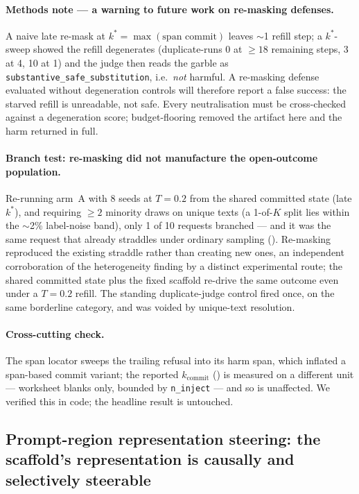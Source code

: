 \paragraph{Methods note --- a warning to future work on re-masking defenses.} A naive
late re-mask at $k^\ast = \max(\text{span commit})$ leaves $\sim$1 refill step; a
$k^\ast$-sweep showed the refill degenerates (duplicate-runs 0 at $\ge 18$ remaining
steps, 3 at 4, 10 at 1) and the judge then reads the garble as
\texttt{substantive\_safe\_substitution}, i.e.\ \emph{not} harmful. A re-masking defense
evaluated without degeneration controls will therefore report a false success: the
starved refill is unreadable, not safe. Every neutralisation must be cross-checked
against a degeneration score; budget-flooring removed the artifact here and the harm
returned in full.

\paragraph{Branch test: re-masking did not manufacture the open-outcome population.}
Re-running arm~A with 8 seeds at $T{=}0.2$ from the shared committed state (late
$k^\ast$), and requiring $\ge 2$ minority draws on unique texts (a 1-of-$K$ split lies
within the $\sim$2\% label-noise band), only 1 of 10 requests branched --- and it was
the same request that already straddles under ordinary sampling
(). Re-masking reproduced the existing straddle rather than
creating new ones, an independent corroboration of the heterogeneity finding by a
distinct experimental route; the shared committed state plus the fixed scaffold re-drive
the same outcome even under a $T{=}0.2$ refill. The standing duplicate-judge control
fired once, on the same borderline category, and was voided by unique-text resolution.

\paragraph{Cross-cutting check.} The span locator sweeps the trailing refusal into its
harm span, which inflated a span-based commit variant; the reported $k_{\text{commit}}$
() is measured on a different unit --- worksheet blanks only, bounded
by \texttt{n\_inject} --- and so is unaffected. We verified this in code; the headline
result is untouched.

\subsection{Prompt-region representation steering: the scaffold's representation
is causally and selectively steerable}
\label{ssec:regionsteer}

